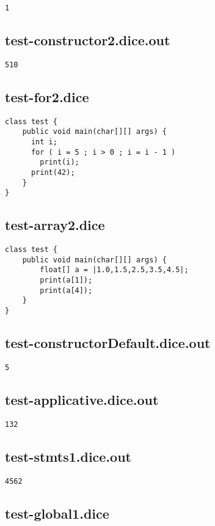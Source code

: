 \begin{verbatim}
1
\end{verbatim}\pagebreak\subsection{test-constructor2.dice.out}
\begin{verbatim}
510
\end{verbatim}\pagebreak\subsection{test-for2.dice}
\begin{verbatim}
class test {
	public void main(char[][] args) {
	  int i;
	  for ( i = 5 ; i > 0 ; i = i - 1 )
	    print(i); 
	  print(42);
	}
}

\end{verbatim}\pagebreak\subsection{test-array2.dice}
\begin{verbatim}
class test {
	public void main(char[][] args) {
		float[] a = |1.0,1.5,2.5,3.5,4.5|;
		print(a[1]);
		print(a[4]);
	}
}

\end{verbatim}\pagebreak\subsection{test-constructorDefault.dice.out}
\begin{verbatim}
5
\end{verbatim}\pagebreak\subsection{test-applicative.dice.out}
\begin{verbatim}
132
\end{verbatim}\pagebreak\subsection{test-stmts1.dice.out}
\begin{verbatim}
4562
\end{verbatim}\pagebreak\subsection{test-global1.dice}
